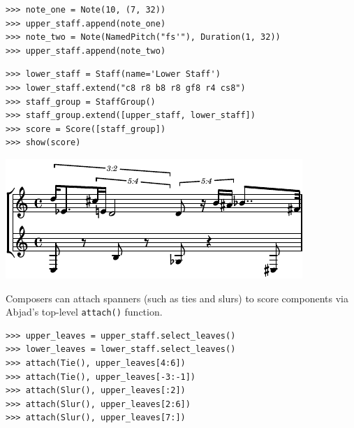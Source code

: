 \documentclass{article}
\begin{document}

\begin{lstlisting}
>>> note_one = Note(10, (7, 32))
>>> upper_staff.append(note_one)
>>> note_two = Note(NamedPitch("fs'"), Duration(1, 32))
>>> upper_staff.append(note_two)
\end{lstlisting}

\begin{lstlisting}
>>> lower_staff = Staff(name='Lower Staff')
>>> lower_staff.extend("c8 r8 b8 r8 gf8 r4 cs8")
>>> staff_group = StaffGroup()
>>> staff_group.extend([upper_staff, lower_staff])
>>> score = Score([staff_group])
>>> show(score)
\end{lstlisting}
\includegraphics{assets/lilypond-8d72e9a5aced38c13d509aea16c53ca6.pdf}

Composers can attach spanners (such as ties and slurs) to score components via
Abjad's top-level \texttt{attach()} function.

\begin{lstlisting}
>>> upper_leaves = upper_staff.select_leaves()
>>> lower_leaves = lower_staff.select_leaves()
>>> attach(Tie(), upper_leaves[4:6])
>>> attach(Tie(), upper_leaves[-3:-1])
>>> attach(Slur(), upper_leaves[:2])
>>> attach(Slur(), upper_leaves[2:6])
>>> attach(Slur(), upper_leaves[7:])
\end{lstlisting}
\end{document}
